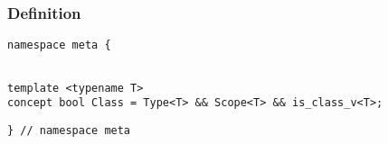 
\subsubsection{Definition}

\begin{verbatim}
namespace meta {
\end{verbatim}
\begin{verbatim}

template <typename T>
concept bool Class = Type<T> && Scope<T> && is_class_v<T>;

\end{verbatim}
\begin{verbatim}
} // namespace meta
\end{verbatim}
